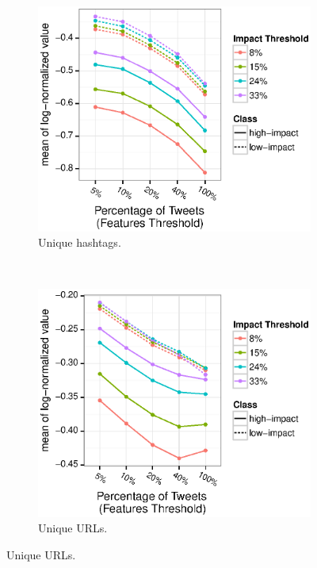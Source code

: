 \documentclass[10pt,letterpaper]{article}
\begin{document}
\begin{figure}[h]
  \begin{subfigure}[h]{0.45\textwidth}
    \includegraphics[width=\textwidth]{figures_SI/Plots_from_data/total_unique_hashtags.eps}
    \caption{Unique hashtags.} \label{fig:feat_uniq_hashtags}
  \end{subfigure}
  ~
  \begin{subfigure}[h]{0.45\textwidth}
    \includegraphics[width=\textwidth]{figures_SI/Plots_from_data/total_unique_urls.eps}
    \caption{Unique URLs.} \label{fig:feat_uniq_urls}
  \end{subfigure}

\end{figure}
\end{document}
